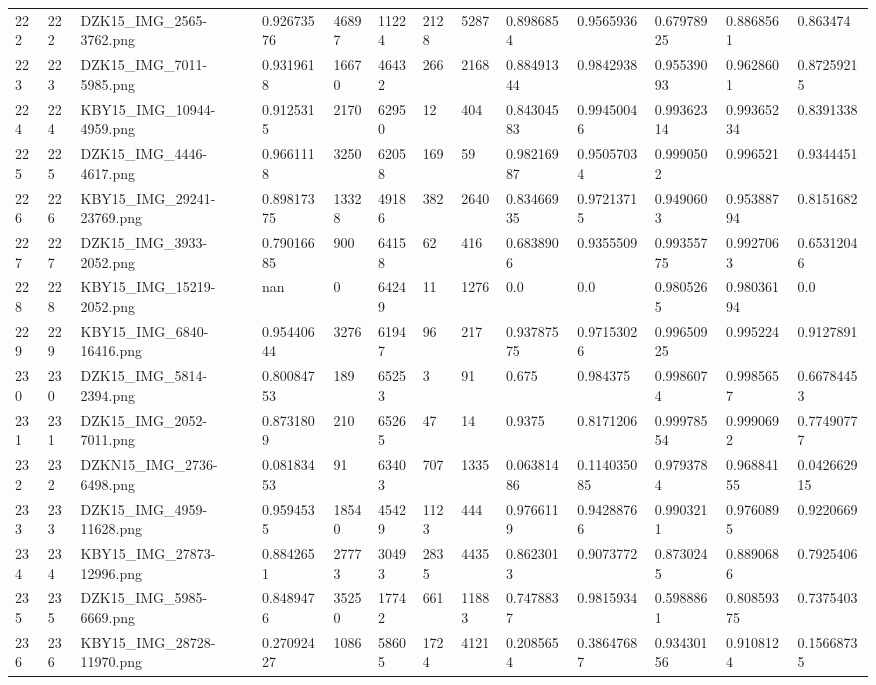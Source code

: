 \documentclass[11pt, a4paper, twoside]{report}
\begin{document}
\begin{longtable}[c]{@{}lllllllllllll@{}}
222 & 222 & DZK15\_IMG\_2565-3762.png & 0.92673576 & 46897 & 11224 & 2128 & 5287 & 0.8986854 & 0.9565936 & 0.67978925 & 0.8868561 & 0.863474 \\
223 & 223 & DZK15\_IMG\_7011-5985.png & 0.9319618 & 16670 & 46432 & 266 & 2168 & 0.88491344 & 0.9842938 & 0.95539093 & 0.9628601 & 0.87259215 \\
224 & 224 & KBY15\_IMG\_10944-4959.png & 0.9125315 & 2170 & 62950 & 12 & 404 & 0.84304583 & 0.99450046 & 0.99362314 & 0.99365234 & 0.8391338 \\
225 & 225 & DZK15\_IMG\_4446-4617.png & 0.9661118 & 3250 & 62058 & 169 & 59 & 0.98216987 & 0.95057034 & 0.9990502 & 0.996521 & 0.9344451 \\
226 & 226 & KBY15\_IMG\_29241-23769.png & 0.89817375 & 13328 & 49186 & 382 & 2640 & 0.83466935 & 0.97213715 & 0.9490603 & 0.95388794 & 0.8151682 \\
227 & 227 & DZK15\_IMG\_3933-2052.png & 0.79016685 & 900 & 64158 & 62 & 416 & 0.6838906 & 0.9355509 & 0.99355775 & 0.9927063 & 0.65312046 \\
228 & 228 & KBY15\_IMG\_15219-2052.png & nan & 0 & 64249 & 11 & 1276 & 0.0 & 0.0 & 0.9805265 & 0.98036194 & 0.0 \\
229 & 229 & KBY15\_IMG\_6840-16416.png & 0.95440644 & 3276 & 61947 & 96 & 217 & 0.93787575 & 0.97153026 & 0.99650925 & 0.995224 & 0.9127891 \\
230 & 230 & DZK15\_IMG\_5814-2394.png & 0.80084753 & 189 & 65253 & 3 & 91 & 0.675 & 0.984375 & 0.9986074 & 0.9985657 & 0.66784453 \\
231 & 231 & DZK15\_IMG\_2052-7011.png & 0.8731809 & 210 & 65265 & 47 & 14 & 0.9375 & 0.8171206 & 0.99978554 & 0.9990692 & 0.77490777 \\
232 & 232 & DZKN15\_IMG\_2736-6498.png & 0.08183453 & 91 & 63403 & 707 & 1335 & 0.06381486 & 0.114035085 & 0.9793784 & 0.96884155 & 0.042662915 \\
233 & 233 & DZK15\_IMG\_4959-11628.png & 0.9594535 & 18540 & 45429 & 1123 & 444 & 0.9766119 & 0.94288766 & 0.9903211 & 0.9760895 & 0.9220669 \\
234 & 234 & KBY15\_IMG\_27873-12996.png & 0.8842651 & 27773 & 30493 & 2835 & 4435 & 0.8623013 & 0.9073772 & 0.8730245 & 0.8890686 & 0.7925406 \\
235 & 235 & DZK15\_IMG\_5985-6669.png & 0.8489476 & 35250 & 17742 & 661 & 11883 & 0.7478837 & 0.9815934 & 0.5988861 & 0.80859375 & 0.7375403 \\
236 & 236 & KBY15\_IMG\_28728-11970.png & 0.27092427 & 1086 & 58605 & 1724 & 4121 & 0.2085654 & 0.38647687 & 0.93430156 & 0.9108124 & 0.15668735 \\

\end{longtable}
\end{document}
